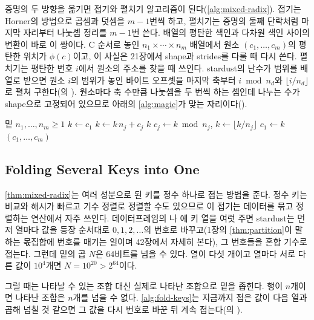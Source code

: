 증명의 두 방향을 옮기면 접기와 펼치기 알고리즘이 된다(\cref{alg:mixed-radix}). 접기는 Horner의 방법으로 곱셈과 덧셈을 $m-1$번씩 하고, 펼치기는 증명의 둘째 단락처럼 마지막 자리부터 나눗셈 정리를 $m-1$번 쓴다. 배열의 평탄한 색인과 다차원 색인 사이의 변환이 바로 이 쌍이다. C 순서로 놓인 $n_1\times\cdots\times n_m$ 배열에서 원소 $(c_1,\dots,c_m)$의 평탄한 위치가 $\phi(c)$이고, 이 사실은 21장에서 shape과 strides를 다룰 때 다시 쓴다. 펼치기는 평탄한 번호 $i$에서 원소의 주소를 찾을 때 쓰인다. stardust의 난수가 범위를 배열로 받으면 원소 $i$의 범위가 놓인 바이트 오프셋을 마지막 축부터 $i\bmod n_d$와 $\lfloor i/n_d\rfloor$로 펼쳐 구한다(의 ). 원소마다 축 수만큼 나눗셈을 두 번씩 하는 셈인데 나누는 수가 shape으로 고정되어 있으므로 아래의 \cref{alg:magic}가 맞는 자리이다().

\begin{algorithm}[htbp]
\begin{algorithmic}[1]
\Require 밑 $n_1,\dots,n_m\ge1$
 
  \State $k\gets c_1$
   $k\gets k\,n_j+c_j$ 
  \EndFor
  \State \Return $k$
\EndFunction
{} 
   $c_j\gets k\bmod n_j$, $k\gets\lfloor k/n_j\rfloor$ 
  \EndFor
  \State $c_1\gets k$
  \State \Return $(c_1,\dots,c_m)$
\EndFunction
\end{algorithmic}
\caption{혼합 기수의 접기와 펼치기}
\label{alg:mixed-radix}
\end{algorithm}

\subsection{Folding Several Keys into One}

\cref{thm:mixed-radix}는 여러 성분으로 된 키를 정수 하나로 접는 방법을 준다. 정수 키는 비교와 해시가 빠르고 기수 정렬로 정렬할 수도 있으므로 이 접기는 데이터를 묶고 정렬하는 연산에서 자주 쓰인다. 데이터프레임의 나 에 키 열을 여럿 주면 stardust는 먼저 열마다 값을 등장 순서대로 $0,1,2,\dots$의 번호로 바꾸고(1장의 \cref{thm:partition}이 말하는 몫집합에 번호를 매기는 일이며 42장에서 자세히 본다), 그 번호들을 혼합 기수로 접는다. 그런데 밑의 곱 $N$은 64비트를 넘을 수 있다. 열이 다섯 개이고 열마다 서로 다른 값이 $10^4$개면 $N=10^{20}>2^{64}$이다.

그럴 때는 나타날 수 있는 조합 대신 실제로 나타난 조합으로 밑을 좁힌다. 행이 $n$개이면 나타난 조합은 $n$개를 넘을 수 없다. \cref{alg:fold-keys}는 지금까지 접은 값이 다음 열과 곱해 넘칠 것 같으면 그 값을 다시 번호로 바꾼 뒤 계속 접는다(의 ).

